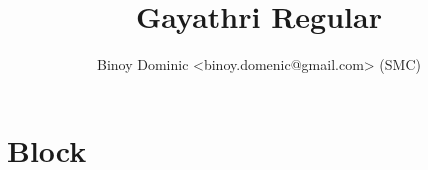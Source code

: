 
  
    \newfontface{}

  \title{Gayathri Regular}
\author{Binoy Dominic <binoy.domenic@gmail.com> (SMC)}
\renewcommand\today{Version 1.000}

\section{Block}

    \newcommand\cell[2]{\begin{tabular}[c]{@{}c@{}}
      \customfont{\symbol{#1}}\\ \tiny{#2}\end{tabular}}
  
